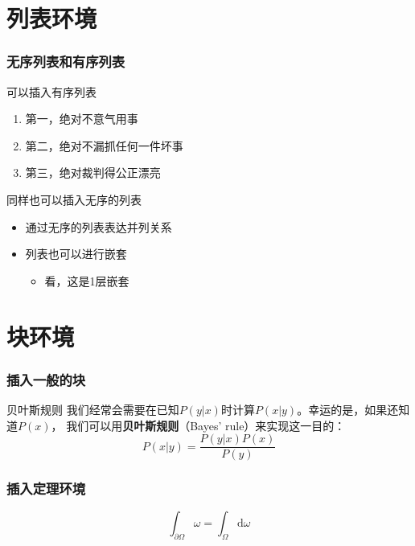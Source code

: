 \documentclass[aspectratio=169]{mybeamer}
\begin{document}
	\section{列表环境}
	\begin{frame}
		\frametitle{无序列表和有序列表}
		可以插入有序列表
		\begin{enumerate}
			\item 第一，绝对不意气用事
			\item 第二，绝对不漏抓任何一件坏事
			\item 第三，绝对裁判得公正漂亮
		\end{enumerate}
		同样也可以插入无序的列表
		\begin{itemize}
			\item 通过无序的列表表达并列关系
			\item 列表也可以进行嵌套
			\begin{itemize}
				\item 看，这是1层嵌套
			\end{itemize}
		\end{itemize}
	\end{frame}

	\section{块环境}
	\begin{frame}
		\frametitle{插入一般的块}
		\begin{block}{贝叶斯规则}
			我们经常会需要在已知$P(y|x)$时计算$P(x|y)$。幸运的是，如果还知道$P(x)$，
			我们可以用\textbf{贝叶斯规则}（Bayes' rule）来实现这一目的：
			$$
			P(x|y) = \frac{P(y|x) P(x)}{P(y)}
			$$
		\end{block}
	\end{frame}
	\begin{frame}
		\frametitle{插入定理环境}
		\begin{theorem}[Stokes定理]
			$$
			\int_{\partial \Omega} \omega = \int_{\Omega} \mathrm{d} \omega	
			$$
		\end{theorem}
	\end{frame}
\end{document}
